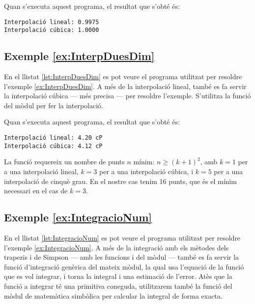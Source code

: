 

Quan s'executa aquest programa, el resultat que s'obté és:
\lstset{
	language=,
	numbers=none,
	frame=none
}
\begin{lstlisting}
Interpolació lineal: 0.9975
Interpolació cúbica: 1.0000
\end{lstlisting} 


\hypertarget{exemple:InterpDuesDim}{\subsection{Exemple \ref*{ex:InterpDuesDim} \InterpDuesDim}}
En el llistat \vref{lst:InterpDuesDim} es pot veure el programa utilitzat per resoldre l'exemple \vref{ex:InterpDuesDim}. A més de la interpolació lineal, també es fa servir la interpolació cúbica --- més precisa --- per resoldre l'exemple. S'utilitza la funció  del mòdul  per fer la interpolació.


Quan s'executa aquest programa, el resultat que s'obté és:
\lstset{
	language=,
	numbers=none,
	frame=none
}
\begin{lstlisting}
Interpolació lineal: 4.20 cP
Interpolació cúbica: 4.12 cP
\end{lstlisting} 

La funció  requereix un nombre de punts $n$ mínim: $n \geq (k+1)^2$, amb $k=1$ per a una interpolació lineal, $k=3$ per a una interpolació cúbica, i $k=5$ per a una interpolació de cinquè grau. En el nostre cas tenim 16 punts, que és el mínim necessari en el cas de $k=3$.

\hypertarget{exemple:IntegracioNum}{\subsection{Exemple \ref*{ex:IntegracioNum} \IntegracioNum}}
En el llistat \vref{lst:IntegracioNum} es pot veure el programa utilitzat per resoldre l'exemple \vref{ex:IntegracioNum}. A més de la integració amb els  mètodes dels trapezis i de Simpson --- amb les funcions  i  del mòdul  --- també es fa servir la funció  d'integració genèrica  del mateix mòdul,  la qual usa l'equació de la funció que es vol integrar, i torna la integral i una estimació de l'error. Atès que la funció a integrar té una primitiva coneguda, utilitzarem també la funció  del mòdul de matemàtica simbòlica  per calcular la integral de forma exacta.


